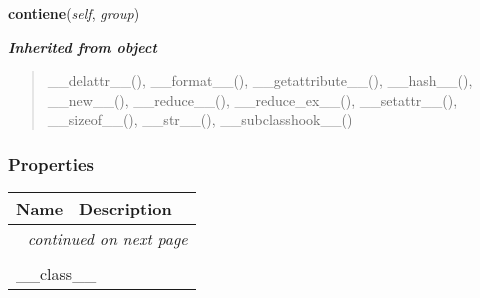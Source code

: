     \label{db_layer:Groups:contiene}

    \vspace{0.5ex}

\hspace{.8\funcindent}\begin{boxedminipage}{\funcwidth}

    \raggedright \textbf{contiene}(\textit{self}, \textit{group})

\setlength{\parskip}{2ex}
\setlength{\parskip}{1ex}
    \end{boxedminipage}


\large{\textbf{\textit{Inherited from object}}}

\begin{quote}
\_\_delattr\_\_(), \_\_format\_\_(), \_\_getattribute\_\_(), \_\_hash\_\_(), \_\_new\_\_(), \_\_reduce\_\_(), \_\_reduce\_ex\_\_(), \_\_setattr\_\_(), \_\_sizeof\_\_(), \_\_str\_\_(), \_\_subclasshook\_\_()
\end{quote}


  \subsubsection{Properties}

    \vspace{-1cm}
\hspace{\varindent}\begin{longtable}{|p{\varnamewidth}|p{\vardescrwidth}|l}
\cline{1-2}
\cline{1-2} \centering \textbf{Name} & \centering \textbf{Description}& \\
\cline{1-2}
\endhead\cline{1-2}\multicolumn{3}{r}{\small\textit{continued on next page}}\\\endfoot\cline{1-2}
\endlastfoot\multicolumn{2}{|l|}{\textit{Inherited from object}}\\
\multicolumn{2}{|p{\varwidth}|}{\raggedright \_\_class\_\_}\\
\cline{1-2}
\end{longtable}



